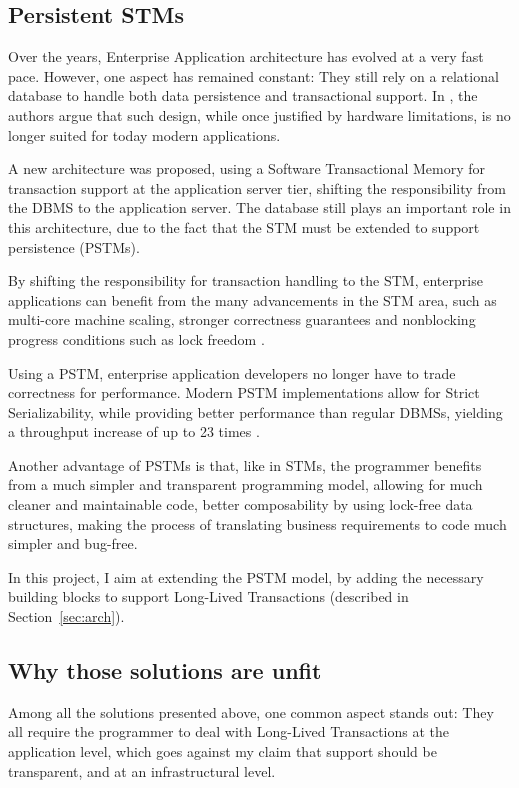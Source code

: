 \documentclass{llncs}
\begin{document}
\subsection{Persistent STMs}
\label{sec:pstm}

Over the years, Enterprise Application architecture has evolved at a
very fast pace. However, one aspect has remained constant: They still
rely on a relational database to handle both data persistence and
transactional support. In \cite{fernandes2011strict}, the authors
argue that such design, while once justified by hardware limitations,
is no longer suited for today modern applications.

A new architecture was proposed, using a Software Transactional Memory
for transaction support at the application server tier, shifting the
responsibility from the DBMS to the application server. The database
still plays an important role in this architecture, due to the fact
that the STM must be extended to support persistence (PSTMs).

By shifting the responsibility for transaction handling to the STM,
enterprise applications can benefit from the many advancements in the
STM area, such as multi-core machine scaling, stronger correctness
guarantees and nonblocking progress conditions such as lock freedom
\cite{fernandes2011lock}.

Using a PSTM, enterprise application developers no longer have to
trade correctness for performance. Modern PSTM implementations allow
for Strict Serializability, while providing better performance than
regular DBMSs, yielding a throughput increase of up to 23 times
\cite{fernandes2011strict}.

Another advantage of PSTMs is that, like in STMs, the programmer
benefits from a much simpler and transparent programming model,
allowing for much cleaner and maintainable code, better composability
by using lock-free data structures, making the process of translating
business requirements to code much simpler and bug-free.

In this project, I aim at extending the PSTM model, by adding the
necessary building blocks to support Long-Lived Transactions
(described in Section~\ref{sec:arch}).

\subsection{Why those solutions are unfit}

Among all the solutions presented above, one common aspect stands out:
They all require the programmer to deal with Long-Lived Transactions
at the application level, which goes against my claim that support
should be transparent, and at an infrastructural level.
\end{document}
